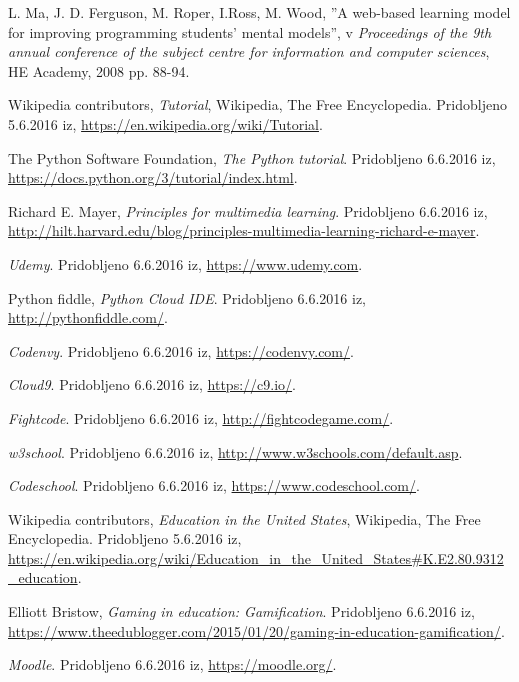 \begin{thebibliography}{100}
 L. Ma, J. D. Ferguson, M. Roper, I.Ross, M. Wood,
  ''A web-based learning model for improving programming students' mental
  models'', v \emph{Proceedings of the 9th annual conference of the subject
  centre for information and computer sciences}, HE Academy, 2008
  pp. 88-94.

 Wikipedia contributors, \emph{Tutorial},
  Wikipedia, The Free Encyclopedia. Pridobljeno 5.6.2016 iz,
  \url{https://en.wikipedia.org/wiki/Tutorial}.

 The Python Software Foundation, \emph{The
    Python tutorial}. Pridobljeno 6.6.2016 iz,
  \url{https://docs.python.org/3/tutorial/index.html}.

 Richard E. Mayer, \emph{Principles for multimedia learning}. Pridobljeno 6.6.2016 iz,
  \url{http://hilt.harvard.edu/blog/principles-multimedia-learning-richard-e-mayer}.

 \emph{Udemy}. Pridobljeno 6.6.2016 iz,
  \url{https://www.udemy.com}.

 Python fiddle, \emph{Python Cloud
    IDE}. Pridobljeno 6.6.2016 iz,
  \url{http://pythonfiddle.com/}.

 \emph{Codenvy}. Pridobljeno 6.6.2016 iz,
  \url{https://codenvy.com/}.

 \emph{Cloud9}. Pridobljeno 6.6.2016 iz,
  \url{https://c9.io/}.

 \emph{Fightcode}. Pridobljeno 6.6.2016 iz,
  \url{http://fightcodegame.com/}.

 \emph{w3school}. Pridobljeno 6.6.2016 iz,
  \url{http://www.w3schools.com/default.asp}.

 \emph{Codeschool}. Pridobljeno 6.6.2016 iz,
  \url{https://www.codeschool.com/}.

 Wikipedia contributors, \emph{Education in the
    United States}, Wikipedia, The Free Encyclopedia. Pridobljeno
  5.6.2016 iz,
  \url{https://en.wikipedia.org/wiki/Education_in_the_United_States#K.E2.80.9312_education}.

 Elliott Bristow, \emph{Gaming in education: Gamification}. Pridobljeno 6.6.2016 iz,
  \url{https://www.theedublogger.com/2015/01/20/gaming-in-education-gamification/}.

 \emph{Moodle}. Pridobljeno 6.6.2016 iz,
  \url{https://moodle.org/}.


\end{thebibliography}
